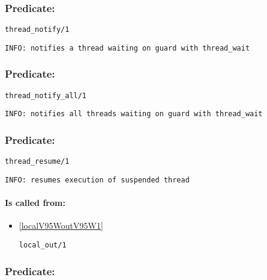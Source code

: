 \subsubsection{Predicate:} \label{threadV95WnotifyV95W1}

\begin{verbatim}
thread_notify/1
\end{verbatim}

{\small \begin{verbatim}
INFO: notifies a thread waiting on guard with thread_wait

\end{verbatim}}

\subsubsection{Predicate:} \label{threadV95WnotifyV95WallV95W1}

\begin{verbatim}
thread_notify_all/1
\end{verbatim}

{\small \begin{verbatim}
INFO: notifies all threads waiting on guard with thread_wait

\end{verbatim}}

\subsubsection{Predicate:} \label{threadV95WresumeV95W1}

\begin{verbatim}
thread_resume/1
\end{verbatim}

{\small \begin{verbatim}
INFO: resumes execution of suspended thread

\end{verbatim}}
\paragraph{Is called from:} 
\begin{itemize}
\item \ref{localV95WoutV95W1} 
\begin{verbatim}
local_out/1
\end{verbatim}

\end{itemize}

\subsubsection{Predicate:} \label{threadV95WsuspendV95W1}

